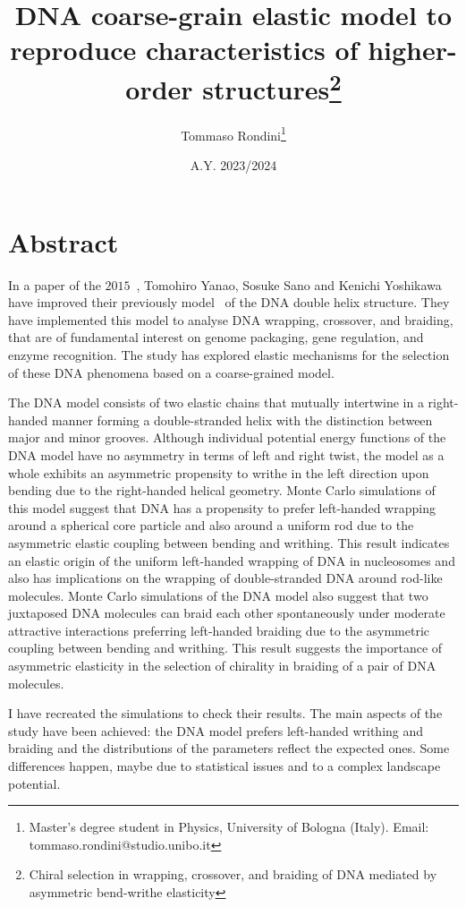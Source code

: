 \documentclass[a4paper,10pt]{article}
\title{DNA coarse-grain elastic model to reproduce characteristics of higher-order structures\thanks{Chiral selection in wrapping, crossover, and braiding of DNA mediated by asymmetric bend-writhe elasticity\cite{main}}}
\author{Tommaso Rondini\thanks{Master's degree student in Physics, University of Bologna (Italy). Email: tommaso.rondini@studio.unibo.it}}
\date{A.Y. 2023/2024}
\begin{document}
\maketitle

\section*{Abstract}
In a paper of the $2015$~\cite{main}, Tomohiro Yanao, Sosuke Sano and Kenichi Yoshikawa have improved their previously model~\cite{old, very_old} of the DNA double helix structure.
They have implemented this model to analyse DNA wrapping, crossover, and braiding, that are of fundamental interest on genome packaging, gene regulation, and enzyme recognition.
The study has explored elastic mechanisms for the selection of these DNA phenomena based on a coarse-grained model.

The DNA model consists of two elastic chains that mutually intertwine in a right-handed manner forming a double-stranded helix with the distinction between major and minor grooves.
Although individual potential energy functions of the DNA model have no asymmetry in terms of left and right twist, the model as a whole exhibits an asymmetric propensity to writhe in the left direction upon bending due to the right-handed helical geometry.
Monte Carlo simulations of this model suggest that DNA has a propensity to prefer left-handed wrapping around a spherical core particle and also around a uniform rod due to the asymmetric elastic coupling between bending and writhing.
This result indicates an elastic origin of the uniform left-handed wrapping of DNA in nucleosomes and also has implications on the wrapping of double-stranded DNA around rod-like molecules.
Monte Carlo simulations of the DNA model also suggest that two juxtaposed DNA molecules can braid each other spontaneously under moderate attractive interactions preferring left-handed braiding due to the asymmetric coupling between bending and writhing.
This result suggests the importance of asymmetric elasticity in the selection of chirality in braiding of a pair of DNA molecules.

I have recreated the simulations to check their results.
The main aspects of the study have been achieved: the DNA model prefers left-handed writhing and braiding and the distributions of the parameters reflect the expected ones.
Some differences happen, maybe due to statistical issues and to a complex landscape potential.
\end{document}
